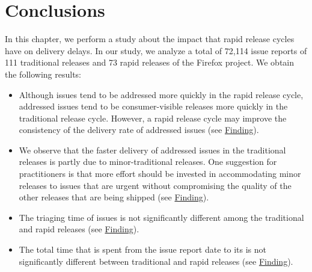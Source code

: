 \section{Conclusions} \label{sec:conclusion}

In this chapter, we perform a study about the impact that
rapid release cycles have on delivery delays. In our study, we analyze
a total of 72,114 issue reports of 111 traditional releases and 73 rapid
releases of the Firefox project. We obtain the following results:

\begin{itemize}

	\item Although issues tend to be addressed more quickly in the rapid
		release cycle, addressed issues tend to be \DIFdelbegin {}\DIFdelend \DIFaddbegin {}\DIFaddend consumer-visible releases more quickly in the traditional
		release cycle. However, a rapid release cycle may improve the
		consistency of the delivery rate of addressed issues (see
		\DIFdelbegin %
\DIFdel{~\ref{obs:2}}\DIFdelend \DIFaddbegin \hyperref[find18]{Finding}\DIFadd{~\ref{find18}}\DIFaddend ).

	\item We observe that the faster delivery of addressed issues in the
		traditional releases is partly due to minor-traditional
		releases. One suggestion for practitioners is that more effort
		should be invested in accommodating minor releases to issues
		that are urgent without compromising the quality of the other
		releases that are being shipped (see
		\DIFdelbegin %
\DIFdel{~\ref{obs:3}}\DIFdelend \DIFaddbegin \hyperref[find19]{Finding}\DIFadd{~\ref{find19}}\DIFaddend ).

	\item The triaging time of issues is not significantly different among
		the traditional and rapid releases (see
		\DIFdelbegin %
\DIFdel{~\ref{obs:2}}\DIFdelend \DIFaddbegin \hyperref[find18]{Finding}\DIFadd{~\ref{find18}}\DIFaddend ).

	\item The total time that is spent from the issue report date to its
		\DIFdelbegin {}\DIFdelend \DIFaddbegin {}\DIFaddend is not significantly different
		between traditional and rapid releases (see
		\DIFdelbegin %
\DIFdel{~\ref{obs:1}}\DIFdelend \DIFaddbegin \hyperref[find17]{Finding}\DIFadd{~\ref{find17}}\DIFaddend ).


\end{itemize}
